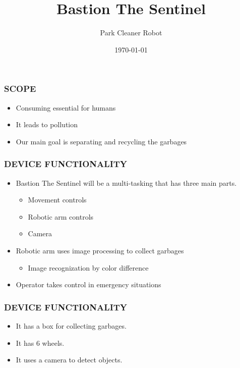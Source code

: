 \documentclass{beamer}
\title{Bastion The Sentinel}
\author{Park Cleaner Robot}
\institute{Istanbul Bilgi University}
\date{\today}
\begin{document}
 \frame{\titlepage}
 
 \begin{frame}
  \frametitle{SCOPE}
  \begin{itemize}
   \item Consuming essential for humans
   \item It leads to pollution
   \item Our main goal is separating and recycling the garbages
  \end{itemize}
 \end{frame}

 \begin{frame}
  \frametitle{DEVICE FUNCTIONALITY}
  \begin{itemize}
   \item Bastion The Sentinel will be a multi-tasking that has three main parts.
   \begin{itemize}
    \item Movement controls
    \item Robotic arm controls
    \item Camera
   \end{itemize}
   \item Robotic arm uses image processing to collect garbages
   \begin{itemize}
    \item Image recognization by color difference
   \end{itemize}
   \item Operator takes control in emergency situations
  \end{itemize}
 \end{frame}

 \begin{frame}
  \frametitle{DEVICE FUNCTIONALITY}
  \begin{itemize}
   \item It has a box for collecting garbages.
   \item It has 6 wheels. 
   \item It uses a camera to detect objects.
  \end{itemize}
 \end{frame}
\end{document}
